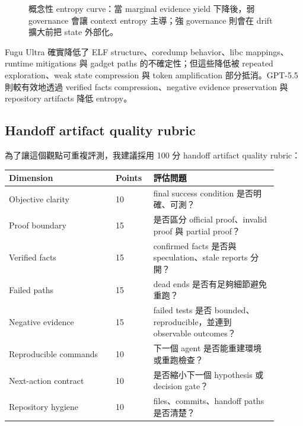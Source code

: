\documentclass[UTF8,a4paper,11pt]{ctexart}
\begin{document}
\begin{figure}[htbp]
\centering
{}
\caption{概念性 entropy curve：當 marginal evidence yield 下降後，弱 governance 會讓 context entropy 主導；強 governance 則會在 drift 擴大前把 state 外部化。}
\end{figure}

Fugu Ultra 確實降低了 ELF structure、coredump behavior、libc mappings、runtime mitigations 與 gadget paths 的不確定性；但這些降低被 repeated exploration、weak state compression 與 token amplification 部分抵消。GPT-5.5 則較有效地透過 verified facts compression、negative evidence preservation 與 repository artifacts 降低 entropy。

\subsection{Handoff artifact quality rubric}

為了讓這個觀點可重複評測，我建議採用 100 分 handoff artifact quality rubric：

\begin{longtable}{L{0.36\linewidth} L{0.12\linewidth} L{0.42\linewidth}}
\toprule
Dimension & Points & 評估問題\\
\midrule
Objective clarity & 10 & final success condition 是否明確、可測？\\
Proof boundary & 15 & 是否區分 official proof、invalid proof 與 partial proof？\\
Verified facts & 15 & confirmed facts 是否與 speculation、stale reports 分開？\\
Failed paths & 15 & dead ends 是否有足夠細節避免重跑？\\
Negative evidence & 15 & failed tests 是否 bounded、reproducible，並連到 observable outcomes？\\
Reproducible commands & 10 & 下一個 agent 是否能重建環境或重跑檢查？\\
Next-action contract & 10 & 是否縮小下一個 hypothesis 或 decision gate？\\
Repository hygiene & 10 & files、commits、handoff paths 是否清楚？\\
\bottomrule
\end{longtable}
\end{document}

